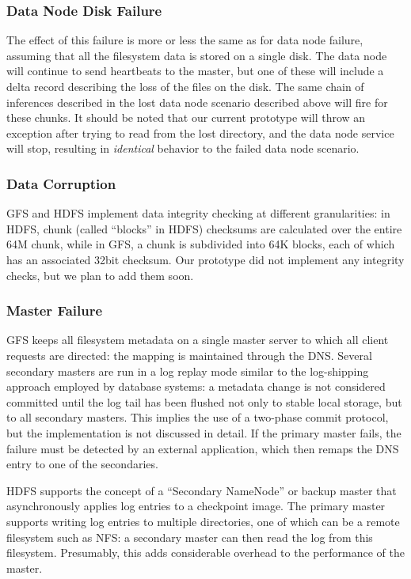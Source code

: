 \documentclass{article}
\begin{document}
\subsubsection{Data Node Disk Failure}
The effect of this failure is more or less the same as for data node
failure, assuming that all the filesystem data is stored on a single
disk.  The data node will continue to send heartbeats to the master,
but one of these will include a delta record describing the loss of
the files on the disk.  The same chain of inferences described in the
lost data node scenario described above will fire for these chunks.
It should be noted that our current prototype will throw an exception
after trying to read from the lost directory, and the data node
service will stop, resulting in \emph{identical} behavior to the
failed data node scenario.

\subsubsection{Data Corruption}
GFS and HDFS implement data integrity checking at different
granularities: in HDFS, chunk (called ``blocks'' in HDFS) checksums
are calculated over the entire 64M chunk, while in GFS, a chunk is
subdivided into 64K blocks, each of which has an associated 32bit
checksum.  Our prototype did not implement any integrity checks, but
we plan to add them soon.

\subsubsection{Master Failure}
GFS keeps all filesystem metadata on a single master server to which
all client requests are directed: the mapping is maintained through
the DNS.  Several secondary masters are run in a log replay mode
similar to the log-shipping approach employed by database systems: a
metadata change is not considered committed until the log tail has
been flushed not only to stable local storage, but to all secondary
masters.  This implies the use of a two-phase commit protocol, but the
implementation is not discussed in detail.  If the primary master
fails, the failure must be detected by an external application, which
then remaps the DNS entry to one of the secondaries.
 
HDFS supports the concept of a ``Secondary NameNode'' or backup master
that asynchronously applies log entries to a checkpoint image.  The
primary master supports writing log entries to multiple directories,
one of which can be a remote filesystem such as NFS: a secondary
master can then read the log from this filesystem.  Presumably, this
adds considerable overhead to the performance of the master.
 
\end{document}
